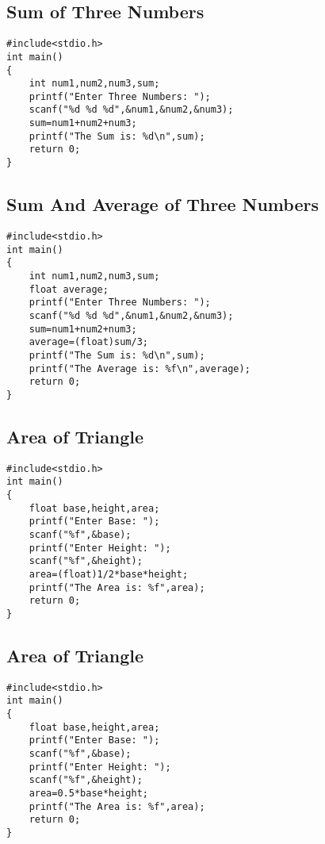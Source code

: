 \documentclass[a4paper,14pt]{article}
\begin{document}
\subsection{Sum of Three Numbers}
\vspace{0.5cm}
\begin{lstlisting}[caption={Sum of Three Numbers}]
#include<stdio.h>
int main()
{
    int num1,num2,num3,sum;
    printf("Enter Three Numbers: ");
    scanf("%d %d %d",&num1,&num2,&num3);
    sum=num1+num2+num3;
    printf("The Sum is: %d\n",sum);
    return 0;
}
\end{lstlisting}
\newpage

\subsection{Sum And Average of Three Numbers}
\vspace{0.5cm}
\begin{lstlisting}[caption={Sum And Average of Three Numbers}]
#include<stdio.h>
int main()
{
    int num1,num2,num3,sum;
    float average;
    printf("Enter Three Numbers: ");
    scanf("%d %d %d",&num1,&num2,&num3);
    sum=num1+num2+num3;
    average=(float)sum/3;
    printf("The Sum is: %d\n",sum);
    printf("The Average is: %f\n",average);
    return 0;
}
\end{lstlisting}
\newpage

\subsection{Area of Triangle}
\vspace{0.5cm}
\begin{lstlisting}[caption={Area of Triangle}]
#include<stdio.h>
int main()
{
    float base,height,area;
    printf("Enter Base: ");
    scanf("%f",&base);
    printf("Enter Height: ");
    scanf("%f",&height);
    area=(float)1/2*base*height;
    printf("The Area is: %f",area);
    return 0;
}
\end{lstlisting}
\newpage

\subsection{Area of Triangle}
\vspace{0.5cm}
\begin{lstlisting}[caption={Area of Triangle}]
#include<stdio.h>
int main()
{
    float base,height,area;
    printf("Enter Base: ");
    scanf("%f",&base);
    printf("Enter Height: ");
    scanf("%f",&height);
    area=0.5*base*height;
    printf("The Area is: %f",area);
    return 0;
}
\end{lstlisting}
\newpage
\end{document}

